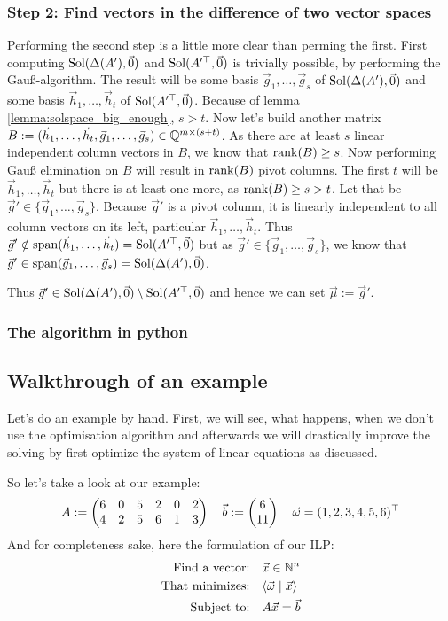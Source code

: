 \subsubsection{Step 2: Find vectors in the difference of two vector spaces}
Performing the second step is a little more clear than perming the first. First computing $\operatorname{Sol}(\Delta(A'), \vec0)$ and $\operatorname{Sol}(A'^\top, \vec0)$ is trivially possible, by performing the Gauß-algorithm. The result will be some basis $\vec g_{1}, \dots, \vec g_s$ of $\operatorname{Sol}(\Delta(A'), \vec0)$ and some basis $\vec h_1, \dots, \vec h_t$ of $\operatorname{Sol}(A'^\top, \vec0)$. Because of lemma \ref{lemma:solspace_big_enough}, $s > t$. Now let's build another matrix $B := (\vec h_1, \dots, \vec h_t, \vec g_{1}, \dots, \vec g_s) \in \mathbb{Q}^{m\times(s+t)}$. As there are at least $s$ linear independent column vectors in $B$, we know that $\operatorname{rank}(B)\geq s$. Now performing Gauß elimination on $B$ will result in $\operatorname{rank}(B)$ pivot columns. The first $t$ will be $\vec h_1, \dots, \vec h_t$ but there is at least one more, as $\operatorname{rank}(B) \geq s > t$. Let that be $\vec g' \in \{\vec g_{1}, \dots, \vec g_s\}$. Because $\vec g'$ is a pivot column, it is linearly independent to all column vectors on its left, particular $\vec h_1, \dots, \vec h_t$. Thus $\vec g' \notin \operatorname{span}(\vec h_1, \dots, \vec h_t) = \operatorname{Sol}(A'^\top, \vec0)$ but as $\vec g' \in \{\vec g_{1}, \dots, \vec g_s\}$, we know that $\vec g' \in \operatorname{span}(\vec g_{1}, \dots, \vec g_s) = \operatorname{Sol}(\Delta(A'), \vec0)$. 

Thus $\vec g' \in \operatorname{Sol}(\Delta(A'), \vec0)\setminus\operatorname{Sol}(A'^\top, \vec0)$ and hence we can set $\vec\mu := \vec g'$.

\subsubsection{The algorithm in python}

\subsection{Walkthrough of an example}
Let's do an example by hand. First, we will see, what happens, when we don't use the optimisation algorithm and afterwards we will drastically improve the solving by first optimize the system of linear equations as discussed.

So let's take a look at our example:
$$A:= \left(\begin{matrix}6&0&5&2&0&2\\4&2&5&6&1&3\end{matrix}\right)\quad\vec b:= \left(\begin{matrix}6\\11\end{matrix}\right) \quad \vec\omega = (1, 2, 3, 4, 5, 6)^\top$$
And for completeness sake, here the formulation of our ILP:
\begin{align*}
    \text{Find a vector:} & \quad \vec x \in \mathbb{N}^n \\
    \text{That minimizes:} & \quad \langle \vec \omega \mid \vec x \rangle\\
    \text{Subject to:} & \quad A\vec x = \vec b \\
\end{align*}

